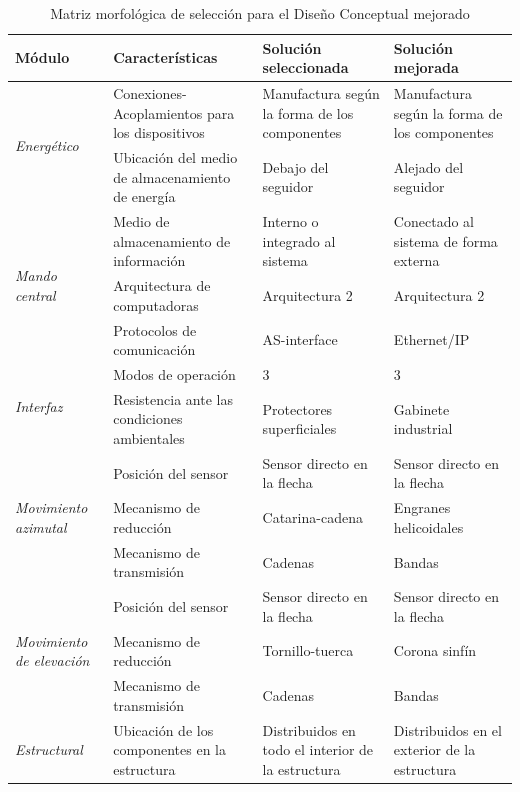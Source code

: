 \begin{table}[H]
	\centering
	\caption{Matriz morfológica de selección para el Diseño Conceptual mejorado}
	\begin{tabular}{@{}|p{2cm}|p{4cm}|p{3.5cm}|p{3.5cm}|}
		\hline
		\textbf{Módulo} & \textbf{Características} & \textbf{Solución seleccionada} & \textbf{Solución mejorada} \\
		\hline \hline
		\multirow{2}{2cm}{\textit{Energético}} & Conexiones-Acoplamientos para los dispositivos & Manufactura según la forma de los componentes & Manufactura según la forma de los componentes \\ 
		\cline{2-4} & Ubicación del medio de almacenamiento de energía & Debajo del seguidor &  Alejado del seguidor \\ 
		\hline \hline
		\multirow{3}{2cm}{\textit{Mando central}} & Medio de almacenamiento de información & Interno o integrado al sistema & Conectado al sistema de forma externa \\ 
		\cline{2-4} & Arquitectura de computadoras & Arquitectura 2 & Arquitectura 2\\ 
		\cline{2-4} & Protocolos de comunicación & AS-interface & Ethernet/IP \\ 
		\hline \hline
		\multirow{2}{2cm}{\textit{Interfaz}} & Modos de operación & 3 & 3\\ 
		\cline{2-4} & Resistencia ante las condiciones ambientales & Protectores superficiales & Gabinete industrial \\ 
		\hline \hline
		\multirow{3}{2cm}{\textit{Movimiento azimutal}} & Posición del sensor & Sensor directo en la flecha & Sensor directo en la flecha \\ 
		\cline{2-4} & Mecanismo de reducción & Catarina-cadena & Engranes helicoidales \\ 
		\cline{2-4} & Mecanismo de transmisión & Cadenas & Bandas \\ 
		\hline \hline
		\multirow{3}{2cm}{\textit{Movimiento de elevación}} & Posición del sensor & Sensor directo en la flecha & Sensor directo en la flecha \\ 
		\cline{2-4} & Mecanismo de reducción & Tornillo-tuerca & Corona sinfín \\ 
		\cline{2-4} & Mecanismo de transmisión & Cadenas & Bandas \\ 
		\hline \hline
		\multirow{5}{2cm}{\textit{Estructural}} & Ubicación de los componentes en la estructura & Distribuidos en todo el interior de la estructura & Distribuidos en el exterior de la estructura \\ 

\end{tabular}
\end{table}
